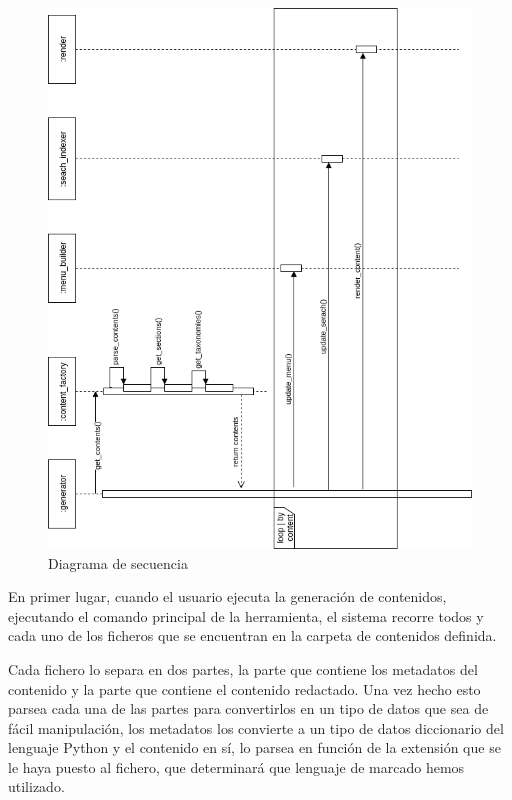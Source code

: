 \begin{figure}[htbp]
    \centering
    \includegraphics[width=1.1\textwidth]{5_diseno/diagrama_secuencia}
    \caption{Diagrama de secuencia}
    \label{fig:diagrama_secuencia}
\end{figure}

En primer lugar, cuando el usuario ejecuta la generación de contenidos, ejecutando el comando
principal de la herramienta, el sistema recorre todos y cada uno de los ficheros que se encuentran
en la carpeta de contenidos definida.

Cada fichero lo separa en dos partes, la parte que contiene los metadatos del contenido y la parte que
contiene el contenido redactado. Una vez hecho esto parsea cada una de las partes para convertirlos en 
un tipo de datos que sea de fácil manipulación, los metadatos los convierte a un tipo de datos
diccionario del lenguaje Python y el contenido en sí, lo parsea en función de la extensión que se le
haya puesto al fichero, que determinará que lenguaje de marcado hemos utilizado.

